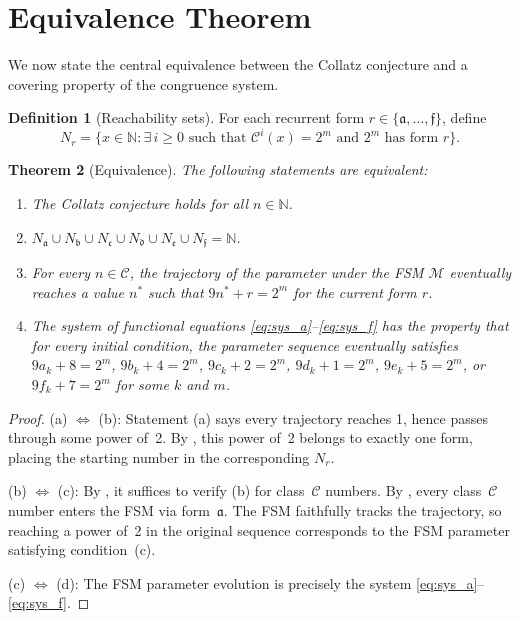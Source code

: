 \documentclass[11pt,a4paper]{article}
\theoremstyle{plain}
\newtheorem{theorem}{Theorem}[section]
\theoremstyle{definition}
\newtheorem{definition}[theorem]{Definition}
\newcommand{\N}{\mathbb{N}}
\newcommand{\Cmap}{\mathcal{C}}
\begin{document}
\section{Equivalence Theorem}
\label{sec:equivalence}

We now state the central equivalence between the Collatz conjecture and a covering property of the congruence system.

\begin{definition}[Reachability sets]\label{def:reachability}
  For each recurrent form $r \in \{\mathfrak{a}, \ldots, \mathfrak{f}\}$, define
  \[
    N_r = \{x \in \N : \exists\, i \geq 0 \text{ such that } \Cmap^i(x) = 2^m \text{ and } 2^m \text{ has form } r\}.
  \]
\end{definition}

\begin{theorem}[Equivalence]\label{thm:equivalence}
  The following statements are equivalent:
  \begin{enumerate}[label=(\alph*)]
    \item The Collatz conjecture holds for all $n \in \N$.
    \item $N_{\mathfrak{a}} \cup N_{\mathfrak{b}} \cup N_{\mathfrak{c}} \cup N_{\mathfrak{d}} \cup N_{\mathfrak{e}} \cup N_{\mathfrak{f}} = \N$.
    \item For every $n \in \mathcal{C}$, the trajectory of the parameter under the FSM $\mathcal{M}$ eventually reaches a value $n^*$ such that $9n^* + r = 2^m$ for the current form $r$.
    \item The system of functional equations \eqref{eq:sys_a}--\eqref{eq:sys_f} has the property that for every initial condition, the parameter sequence eventually satisfies $9a_k + 8 = 2^m$, $9b_k + 4 = 2^m$, $9c_k + 2 = 2^m$, $9d_k + 1 = 2^m$, $9e_k + 5 = 2^m$, or $9f_k + 7 = 2^m$ for some $k$ and $m$.
  \end{enumerate}
\end{theorem}

\begin{proof}
  (a) $\Leftrightarrow$ (b): Statement (a) says every trajectory reaches 1, hence passes through some power of~2. By , this power of~2 belongs to exactly one form, placing the starting number in the corresponding $N_r$.

  (b) $\Leftrightarrow$ (c): By , it suffices to verify (b) for class~$\mathcal{C}$ numbers. By , every class~$\mathcal{C}$ number enters the FSM via form~$\mathfrak{a}$. The FSM faithfully tracks the trajectory, so reaching a power of~2 in the original sequence corresponds to the FSM parameter satisfying condition~(c).

  (c) $\Leftrightarrow$ (d): The FSM parameter evolution is precisely the system \eqref{eq:sys_a}--\eqref{eq:sys_f}.
\end{proof}
\end{document}
